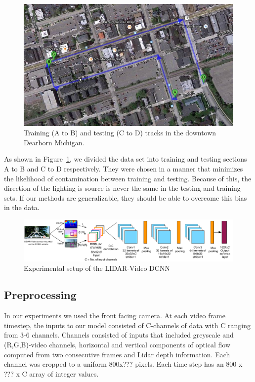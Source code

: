 \documentclass{article}
\begin{document}
\begin{figure}[htbp]
    \centering
        \includegraphics[scale=0.35]{Figures/ford_train_test_track.jpg}
    \caption{Training (A to B) and testing (C to D) tracks in the downtown Dearborn Michigan.}
    \label{fig:ford_train_test_track}
\end{figure}

As shown in Figure~\ref{fig:ford_train_test_track}, we divided the data set into training and testing sections A to B and C to D respectively. They were chosen in a manner that minimizes the likelihood of contamination between training and testing. Because of this, the direction of the lighting is source is never the same in the testing and training sets. If our methods are generalizable, they should be able to overcome this bias in the data.   

\begin{figure}[htbp]
    \centering
        \includegraphics[scale=0.35]{Figures/lidar_dcnn_setup1.pdf}
    \caption{Experimental setup of the LIDAR-Video DCNN}
    \label{fig:Figures_lidar_dcnn_setup1}
\end{figure}


\subsection{Preprocessing} %
\label{sub:preprocessing}
In our experiments we used the front facing camera. At each video frame timestep, the inputs to our model consisted of C-channels of data with C ranging from 3-6 channels. Channels consisted of inputs that included greyscale and (R,G,B)-video channels, horizontal and vertical components of optical flow computed from two consecutive frames and Lidar depth information. Each channel was cropped to a uniform 800x??? pixels. Each time step has an 800 x ??? x C array of integer values.
\end{document}
